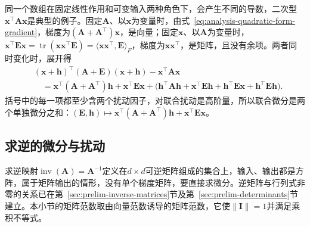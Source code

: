 同一个数组在固定线性作用和可变输入两种角色下，会产生不同的导数，二次型$\bm x^\top\bm A\bm x$是典型的例子。固定$\bm A$、以$\bm x$为变量时，由式~\eqref{eq:analysis-quadratic-form-gradient}，梯度为$(\bm A+\bm A^\top)\bm x$，是向量；固定$\bm x$、以$\bm A$为变量时，$\bm x^\top\bm E\bm x=\operatorname{tr}(\bm x\bm x^\top\bm E)=\langle\bm x\bm x^\top,\bm E\rangle_F$，梯度为$\bm x\bm x^\top$，是矩阵，且没有余项。两者同时变化时，展开得
\[
 \begin{aligned}
 &(\bm x+\bm h)^\top(\bm A+\bm E)(\bm x+\bm h)-\bm x^\top\bm A\bm x\\
 &\quad=\bm x^\top(\bm A+\bm A^\top)\bm h+\bm x^\top\bm E\bm x
 +\bigl(\bm h^\top\bm A\bm h+\bm x^\top\bm E\bm h+\bm h^\top\bm E\bm x+\bm h^\top\bm E\bm h\bigr).
 \end{aligned}
\]
括号中的每一项都至少含两个扰动因子，对联合扰动是高阶量，所以联合微分是两个单独微分之和：$(\bm E,\bm h)\mapsto\bm x^\top(\bm A+\bm A^\top)\bm h+\bm x^\top\bm E\bm x$。

\subsection{求逆的微分与扰动}
\label{sec:multivariable-inverse-differential}

求逆映射$\operatorname{inv}(\bm A)=\bm A^{-1}$定义在$d\times d$可逆矩阵组成的集合上，输入、输出都是方阵，属于矩阵输出的情形，没有单个梯度矩阵，要直接求微分。逆矩阵与行列式非零的关系已在第~\ref{sec:prelim-inverse-matrices}节及第~\ref{sec:prelim-determinants}节建立。本小节的矩阵范数取由向量范数诱导的矩阵范数，它使$\lVert\bm I\rVert=1$并满足乘积不等式。

